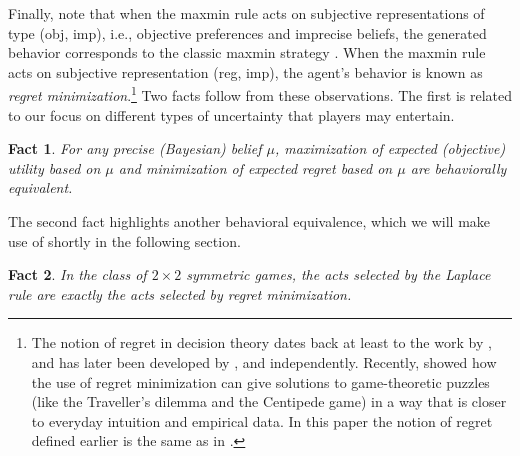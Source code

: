 \documentclass[fleqn,reqno,12pt]{article}
\theoremstyle{Satz}
\newtheorem{fact}{Fact}
\theoremstyle{Bsp}
\begin{document}
Finally, note that when the maxmin rule acts on subjective representations of type (obj, imp),
i.e., objective preferences and imprecise beliefs, the generated behavior corresponds to the
classic maxmin strategy \citep{neumorg44}. When the maxmin rule acts on subjective
representation (reg, imp), the agent's behavior is known as \textit{regret
  minimization}.\footnote{The notion of regret in decision theory dates back at least to the
  work by \citet{Savage1951:The-theory-of-s}, and has later been developed by \citet{bell82},
  \citet{Fishburn1982} and \citet{loosug82} independently. Recently,
  \citet{HalpernPass2012:Iterated-Regret} showed how the use of regret minimization can give
  solutions to game-theoretic puzzles (like the Traveller's dilemma and the Centipede game) in
  a way that is closer to everyday intuition and empirical data. In this paper the notion of
  regret defined earlier is the same as in \citet{HalpernPass2012:Iterated-Regret}.} Two facts
follow from these observations.  The first is related to our focus on different types of
uncertainty that players may entertain.
\begin{fact} \label{fact:maxEU-minReg} 
  For any precise (Bayesian) belief $\mu$, maximization of expected (objective) utility based
  on $\mu$ and minimization of expected regret based on $\mu$ are behaviorally
  equivalent. %
\end{fact}
\noindent The second fact highlights another behavioral equivalence, which we will make use of
shortly in the following section.
\begin{fact} \label{fact:equivalence2x2} In the class of $2 \times 2$ symmetric games, the acts
  selected by the Laplace rule are exactly the acts selected by regret minimization.
\end{fact} 
\end{document}
